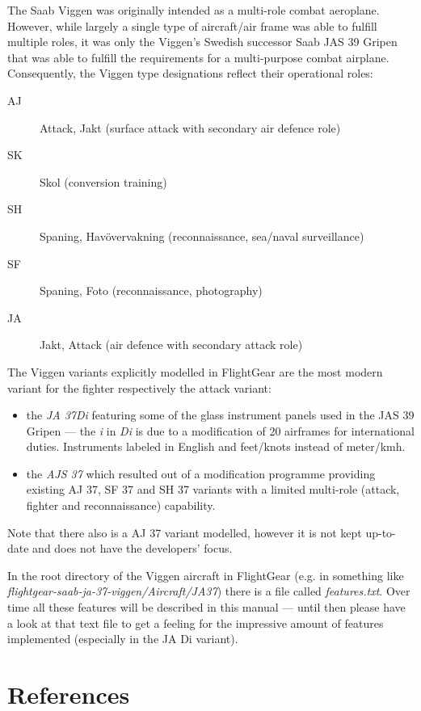 The Saab Viggen was originally intended as a multi-role combat aeroplane. However, while largely a single type of aircraft/air frame was able to fulfill multiple roles, it was only the Viggen's Swedish successor Saab JAS 39 Gripen that was able to fulfill the requirements for a multi-purpose combat airplane. Consequently, the Viggen type designations reflect their operational roles:
\begin{description}
\item[AJ] Attack, Jakt (surface attack with secondary air defence role)
\item[SK] Skol (conversion training)
\item[SH] Spaning, Havövervakning (reconnaissance, sea/naval surveillance)
\item[SF] Spaning, Foto (reconnaissance, photography)
\item[JA] Jakt, Attack (air defence with secondary attack role)
\end{description}

The Viggen variants explicitly modelled in FlightGear are the most modern variant for the fighter respectively the attack variant:
\begin{itemize}
 \item the \emph{JA 37Di} featuring some of the glass instrument panels used in the JAS 39 Gripen --- the \emph{i} in \emph{Di} is due to a modification of 20 airframes for international duties. Instruments labeled in English and feet/knots instead of meter/kmh. 
 \item the \emph{AJS 37} which resulted out of a modification programme providing existing AJ 37, SF 37 and SH 37 variants with a limited multi-role (attack, fighter and reconnaissance) capability.
 \end{itemize}
 
 Note that there also is a AJ 37 variant modelled, however it is not kept up-to-date and does not have the developers' focus.
 
 In the root directory of the Viggen aircraft in FlightGear (e.g. in something like \emph{flightgear-saab-ja-37-viggen/Aircraft/JA37}) there is a file called \emph{features.txt}. Over time all these features will be described in this manual --- until then please have a look at that text file to get a feeling for the impressive amount of features implemented (especially in the JA Di variant).

\section{References}

